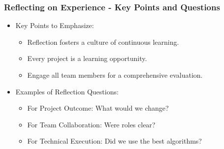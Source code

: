 \documentclass[aspectratio=169]{beamer}
\begin{document}
\begin{frame}[fragile]
    \frametitle{Reflecting on Experience - Key Points and Questions}
    \begin{itemize}
        \item Key Points to Emphasize:
        \begin{itemize}
            \item Reflection fosters a culture of continuous learning.
            \item Every project is a learning opportunity.
            \item Engage all team members for a comprehensive evaluation.
        \end{itemize}
        \item Examples of Reflection Questions:
        \begin{itemize}
            \item For Project Outcome: What would we change?
            \item For Team Collaboration: Were roles clear?
            \item For Technical Execution: Did we use the best algorithms?
        \end{itemize}
    \end{itemize}
\end{frame}
\end{document}
